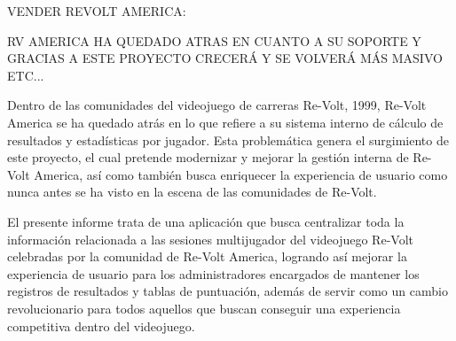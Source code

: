 VENDER REVOLT AMERICA:

RV AMERICA HA QUEDADO ATRAS EN CUANTO A SU SOPORTE Y GRACIAS A ESTE PROYECTO CRECERÁ Y SE VOLVERÁ MÁS MASIVO ETC...

Dentro de las comunidades del videojuego de carreras Re-Volt, 1999, Re-Volt America se ha quedado atrás en lo que refiere a su sistema interno de cálculo de resultados y estadísticas por jugador. Esta problemática genera el surgimiento de este proyecto, el cual pretende modernizar y mejorar la gestión interna de Re-Volt America, así como también busca enriquecer la experiencia de usuario como nunca antes se ha visto en la escena de las comunidades de Re-Volt.

El presente informe trata de una aplicación que busca centralizar toda la información relacionada a las sesiones multijugador del videojuego Re-Volt celebradas por la comunidad de Re-Volt America, logrando así mejorar la experiencia de usuario para los administradores encargados de mantener los registros de resultados y tablas de puntuación, además de servir como un cambio revolucionario para todos aquellos que buscan conseguir una experiencia competitiva dentro del videojuego. 
